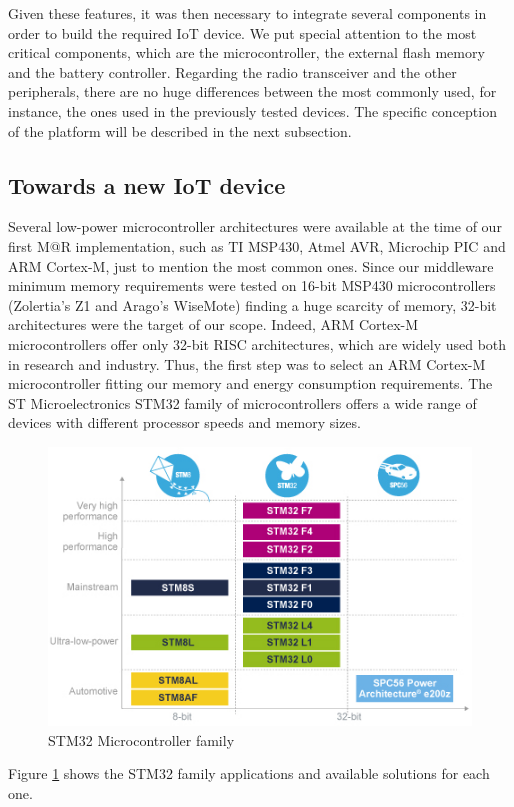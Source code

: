 Given these features, it was then necessary to integrate several components in order to build the required IoT device.
We put special attention to the most critical components, which are the microcontroller, the external flash memory and the battery controller.
Regarding the radio transceiver and the other peripherals, there are no huge differences between the most commonly used, for instance, the ones used in the previously tested devices.
The specific conception of the platform will be described in the next subsection.

\subsection{Towards a new IoT device}

Several low-power microcontroller architectures were available at the time of our first M@R implementation, such as TI MSP430, Atmel AVR, Microchip PIC and ARM Cortex-M, just to mention the most common ones.
Since our middleware minimum memory requirements were tested on 16-bit MSP430 microcontrollers (Zolertia's Z1 and Arago's WiseMote) finding a huge scarcity of memory, 32-bit architectures were the target of our scope.
Indeed, ARM Cortex-M microcontrollers offer only 32-bit RISC architectures, which are widely used both in research and industry.
Thus, the first step was to select an ARM Cortex-M microcontroller fitting our memory and energy consumption requirements.
The ST Microelectronics STM32 family of microcontrollers offers a wide range of devices with different processor speeds and memory sizes.
\begin{figure}[]
	\centering
	\includegraphics[width=0.70\columnwidth]{chapters/modelsAtRuntimeContiki.images/STM32.jpg}
	\caption{STM32 Microcontroller family}
	\label{fig:STM32}
\end{figure}
Figure \ref{fig:STM32} shows the STM32 family applications and available solutions for each one.

